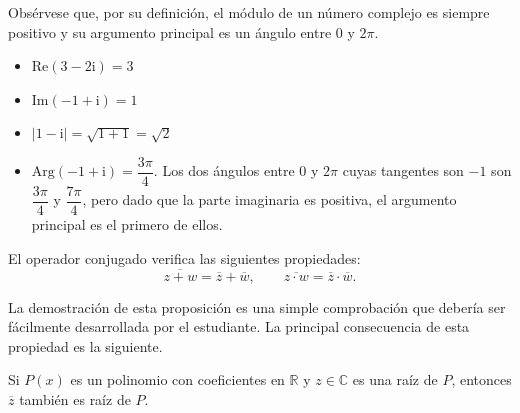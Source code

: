 Obsérvese que, por su definición, el módulo de un número complejo es siempre positivo y su argumento principal es un ángulo entre $0$ y $2\pi$.

\begin{ejemplo-br}
\begin{itemize}
\item $\mathrm{Re}(3-2\mathrm{i})=3$ 
\item $\mathrm{Im}(-1+\mathrm{i})=1$
\item $|1-\mathrm{i}| = \sqrt{1+1}=\sqrt2$
\item $\mathrm{Arg}(-1+\mathrm{i}) = \dfrac{3\pi}4$. Los dos ángulos entre $0$ y $2\pi$ cuyas tangentes son $-1$ son  $\dfrac{3\pi}4$ y $\dfrac{7\pi}4$, pero dado que la parte imaginaria es positiva, el argumento principal es el primero de ellos.\fej
\end{itemize}
\end{ejemplo-br}
%
\begin{proposicion}\label{pr:conjugado}
El operador conjugado verifica las siguientes propiedades:%
\[
\overline{z+w}=\overline{z}+\overline{w},\qquad
\overline{z\cdot w}=\overline{z}\cdot \overline{w}.
\]
\end{proposicion}

La demostración de esta proposición es una simple comprobación que debería ser fácilmente desarrollada por el estudiante. La principal consecuencia de esta propiedad es la siguiente.

\begin{proposicion}
Si $P(x)$ es un polinomio con coeficientes en $\mathbb{R}$ y $z\in\mathbb{C}$ es una raíz de $P$, entonces $\overline z$ también es raíz de $P$.
\end{proposicion}

